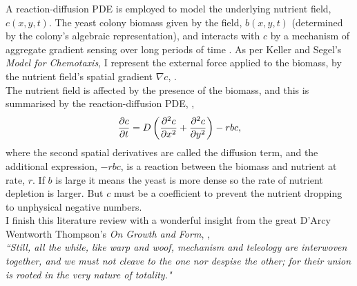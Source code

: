 A reaction-diffusion PDE is employed to model the underlying 
nutrient field, $c(x,y,t)$. The yeast colony biomass given by the field, 
$b(x,y,t)$ (determined by the colony's algebraic representation), and interacts 
with $c$ by a mechanism of aggregate 
gradient sensing over long periods of time \cite{keller1971model}. 
As per Keller and Segel's \textit{Model for Chemotaxis},
I represent the external force applied to the biomass, by the nutrient 
field's spatial gradient $\nabla c$, \cite{keller1971model}.
\\

The nutrient field is affected by the presence of the biomass,
and this is summarised by the reaction-diffusion PDE, \cite{fisher1937wave},
\begin{equation*}
    \pdv{c}{t} = D \left( \frac{\partial^2 c}{\partial x^2} + \frac{\partial^2 c}{\partial y^2}\right) - r b c,
\end{equation*}
where the second spatial derivatives are called the diffusion term, 
and the additional expression, $-rbc$, is a reaction between the biomass and nutrient at rate, $r$.
If $b$ is large it means the yeast is more dense so the rate of nutrient depletion 
is larger. But $c$ must be a coefficient to prevent the nutrient dropping to unphysical negative 
numbers.
\\

I finish this literature review with a wonderful insight
from the great D'Arcy Wentworth Thompson's \textit{On Growth and Form}, 
\cite{thompson1992growth},
\\

\textit{
``Still, all the while, like warp and woof, mechanism and teleology
are interwoven together, and we must not cleave to the one nor
despise the other; for their union is rooted in the very nature of
totality."}







